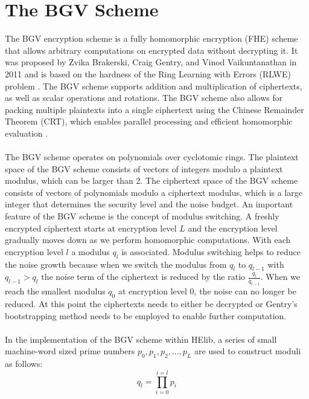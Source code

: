 \documentclass[english,master=eelt,masteroption=ec]{kulemt}
\begin{document}
\section{The BGV Scheme}
The BGV encryption scheme is a fully homomorphic encryption (FHE) scheme that allows arbitrary computations on encrypted data without decrypting it. It was proposed by Zvika Brakerski, Craig Gentry, and Vinod Vaikuntanathan in 2011 \cite{BGV} and is based on the hardness of the Ring Learning with Errors (RLWE) problem \cite{app10175732}\cite{cryptoeprint:2012/230}. The BGV scheme supports addition and multiplication of ciphertexts, as well as scalar operations and rotations. The BGV scheme also allows for packing multiple plaintexts into a single ciphertext using the Chinese Remainder Theorem (CRT), which enables parallel processing and efficient homomorphic evaluation \cite{FHEsimd}.
\\\\
The BGV scheme operates on polynomials over cyclotomic rings. The plaintext space of the BGV scheme consists of vectors of integers modulo a plaintext modulus, which can be larger than 2. The ciphertext space of the BGV scheme consists of vectors of polynomials modulo a ciphertext modulus, which is a large integer that determines the security level and the noise budget. An important feature of the BGV scheme is the concept of modulus switching. A freshly encrypted ciphertext starts at encryption level $L$ and the encryption level gradually moves down as we perform homomorphic computations. With each encryption level $l$ a modulus $q_l$ is associated. Modulus switching helps to reduce the noise growth because when we switch the modulus from $q_l$ to $q_{l-1}$ with $q_{l-1} > q_l$ the noise term of the ciphertext is reduced by the ratio $\frac{q_l}{q_{l-1}}$. When we reach the smallest modulus $q_0$ at encryption level 0, the noise can no longer be reduced. At this point the ciphertexts needs to either be decrypted or Gentry's bootstrapping method\cite{10.1145/1536414.1536440} needs to be employed to enable further computation.
\\\\
In the implementation of the BGV scheme within HElib, a series of small machine-word sized prime numbers ${p_0, p_1, p_2, \ldots, p_L}$ are used to construct moduli as follows:\cite{cryptoeprint:2014/873} 
\[q_l = \prod_{i=0}^{i=l} p_i\]
\end{document}
